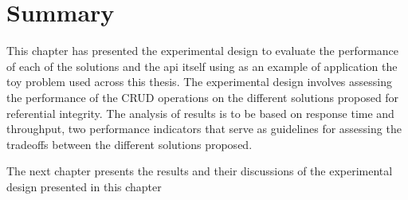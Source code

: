 \section{Summary}
	This chapter has presented the experimental design to evaluate the performance
	of each of the solutions and the api itself using as an example of application
	the toy problem used across this thesis. The experimental design involves
	assessing the performance of the CRUD operations on the different solutions
	proposed for referential integrity. The analysis of results is to be based on
	response time and throughput, two performance indicators that serve as
	guidelines for assessing the tradeoffs between the different solutions
	proposed.
	
	
	The next chapter presents the results and their discussions of the
	experimental design presented in this chapter
 






